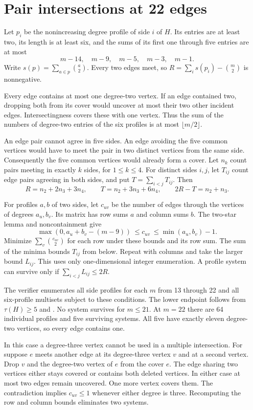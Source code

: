 \documentclass[10pt]{article}
\begin{document}
\section{Pair intersections at 22 edges}

Let $p_i$ be the nonincreasing degree profile of side $i$ of $H$.
Its entries are at least two, its length is at least six, and the sums of
its first one through five entries are at most
\[
m-14,\quad m-9,\quad m-5,\quad m-3,\quad m-1.
\]
Write $s(p)=\sum_{a\in p}\binom a2$. Every two edges meet, so
$R=\sum_i s(p_i)-\binom m2$ is nonnegative.

Every edge contains at most one degree-two vertex. If an edge contained
two, dropping both from its cover would uncover at most their two
other incident edges. Intersectingness covers these with one vertex.
Thus the sum of the numbers of degree-two entries of the six profiles
is at most $\lfloor m/2\rfloor$.

An edge pair cannot agree in five sides. An edge avoiding the five
common vertices would have to meet the pair in two distinct vertices
from the same side. Consequently the five common vertices would
already form a cover.
Let $n_k$ count pairs meeting in exactly $k$ sides, for $1\leq k\leq4$.
For distinct sides $i,j$, let $T_{ij}$ count edge pairs agreeing in both
sides, and put $T=\sum_{i<j}T_{ij}$. Then
\[
 R=n_2+2n_3+3n_4,\qquad T=n_2+3n_3+6n_4,\qquad 2R-T=n_2+n_3.
\]

For profiles $a,b$ of two sides, let $c_{uv}$ be the number of
edges through the vertices of degrees $a_u,b_v$. Its matrix has
row sums $a$ and column sums $b$. The two-star lemma and
noncontainment give
\[
 \max(0,a_u+b_v-(m-9))\ \leq c_{uv}\ \leq\min(a_u,b_v)-1 .
\]
Minimize $\sum_v\binom{c_{uv}}2$ for each row under these bounds and
its row sum. The sum of the minima bounds $T_{ij}$ from below.
Repeat with columns and take the larger bound $L_{ij}$. This uses
only one-dimensional integer enumeration. A profile system can
survive only if $\sum_{i<j}L_{ij}\leq2R$.

The verifier enumerates all side profiles for each $m$ from 13
through 22 and all six-profile multisets subject to these conditions.
The lower endpoint follows from $\tau(H)\geq5$ and \cite{abw}.
No system survives for $m\leq21$. At $m=22$ there are 64 individual
profiles and five surviving systems. All five have exactly eleven
degree-two vertices, so every edge contains one.

In this case a degree-three vertex cannot be used in a multiple
intersection. For suppose $e$ meets another edge at its degree-three
vertex $v$ and at a second vertex. Drop $v$ and the degree-two vertex
of $e$ from the cover $e$. The edge sharing two vertices either
stays covered or contains both deleted vertices. In either case
at most two edges remain uncovered. One more vertex covers them.
The contradiction implies $c_{uv}\leq1$ whenever either degree is three.
Recomputing the row and column bounds eliminates two systems.
\end{document}
